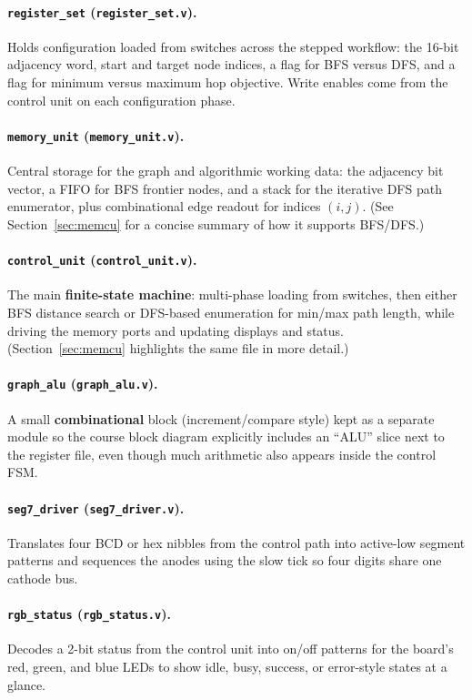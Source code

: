 \documentclass[11pt,a4paper]{article}
\begin{document}
\paragraph{\texttt{register\_set} (\texttt{register\_set.v}).}
Holds configuration loaded from switches across the stepped workflow: the 16-bit adjacency word, start and target node indices, a flag for BFS versus DFS, and a flag for minimum versus maximum hop objective. Write enables come from the control unit on each configuration phase.

\paragraph{\texttt{memory\_unit} (\texttt{memory\_unit.v}).}
Central storage for the graph and algorithmic working data: the adjacency bit vector, a FIFO for BFS frontier nodes, and a stack for the iterative DFS path enumerator, plus combinational edge readout for indices $(i,j)$. (See Section~\ref{sec:memcu} for a concise summary of how it supports BFS/DFS.)

\paragraph{\texttt{control\_unit} (\texttt{control\_unit.v}).}
The main \textbf{finite-state machine}: multi-phase loading from switches, then either BFS distance search or DFS-based enumeration for min/max path length, while driving the memory ports and updating displays and status. (Section~\ref{sec:memcu} highlights the same file in more detail.)

\paragraph{\texttt{graph\_alu} (\texttt{graph\_alu.v}).}
A small \textbf{combinational} block (increment/compare style) kept as a separate module so the course block diagram explicitly includes an ``ALU'' slice next to the register file, even though much arithmetic also appears inside the control FSM.

\paragraph{\texttt{seg7\_driver} (\texttt{seg7\_driver.v}).}
Translates four BCD or hex nibbles from the control path into active-low segment patterns and sequences the anodes using the slow tick so four digits share one cathode bus.

\paragraph{\texttt{rgb\_status} (\texttt{rgb\_status.v}).}
Decodes a 2-bit status from the control unit into on/off patterns for the board’s red, green, and blue LEDs to show idle, busy, success, or error-style states at a glance.
\end{document}
